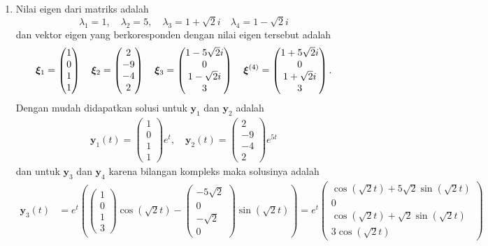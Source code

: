 \documentclass[a4paper]{article}
\theoremstyle{definisi}
\newcommand{\bfxi}{\boldsymbol{\xi}}
\numberwithin{equation}{section}
\begin{document}
\begin{enumerate}
    \item Nilai eigen dari matriks adalah
    \[\lambda_1 = 1, \quad \lambda_2 = 5, \quad \lambda_3 = 1 + \sqrt{2}i \quad \lambda_4 = 1 - \sqrt{2}i\]
    dan vektor eigen yang berkoresponden dengan nilai eigen tersebut adalah
    \[\bfxi_1 = \begin{pmatrix}1\\0\\1\\1\end{pmatrix} \quad \bfxi_2 = \begin{pmatrix}2\\-9\\-4\\2\end{pmatrix} \quad \bfxi_3 = \begin{pmatrix}1-5\sqrt{2}i\\0\\\-1-\sqrt{2}i\\3\end{pmatrix} \quad \bfxi^{(4)} = \begin{pmatrix}1+5\sqrt{2}i\\0\\\-1+\sqrt{2}i\\3\end{pmatrix}.\]
    Dengan mudah didapatkan solusi untuk $\mathbf{y}_1$ dan $\mathbf{y}_2$ adalah
    \begin{align*}
      \mathbf{y}_1(t) = \begin{pmatrix}1\\0\\1\\1\end{pmatrix}e^t,\quad
      \mathbf{y}_2(t) = \begin{pmatrix}2\\-9\\-4\\2\end{pmatrix}e^{5t}
    \end{align*}
    dan untuk $\mathbf{y}_3$ dan $\mathbf{y}_4$ karena bilangan kompleks maka solusinya adalah
    \begin{align*}
      \mathbf{y}_3(t) &= e^t\left(\begin{pmatrix}1\\0\\1\\3\end{pmatrix}\cos(\sqrt{2}t) - \begin{pmatrix}-5\sqrt{2}\\0\\-\sqrt{2}\\0\end{pmatrix}\sin(\sqrt{2}t)\right)= e^t\begin{pmatrix}\cos(\sqrt{2}t)+5\sqrt{2}\sin(\sqrt{2}t)\\0\\\cos(\sqrt{2}t)+\sqrt{2}\sin(\sqrt{2}t)\\3\cos(\sqrt{2}t)\end{pmatrix}\\

\end{align*}
\end{enumerate}
\end{document}
